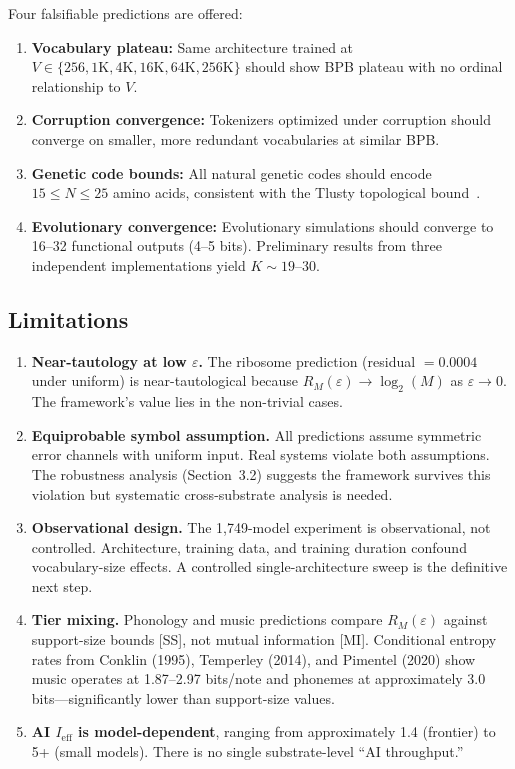 \documentclass[11pt]{article}
\begin{document}
Four falsifiable predictions are offered:
\begin{enumerate}
    \item \textbf{Vocabulary plateau:} Same architecture trained at $V \in \{256, 1\mathrm{K}, 4\mathrm{K}, 16\mathrm{K}, 64\mathrm{K}, 256\mathrm{K}\}$ should show BPB plateau with no ordinal relationship to $V$.
    \item \textbf{Corruption convergence:} Tokenizers optimized under corruption should converge on smaller, more redundant vocabularies at similar BPB.
    \item \textbf{Genetic code bounds:} All natural genetic codes should encode $15 \leq N \leq 25$ amino acids, consistent with the Tlusty topological bound~\cite{tlusty2008}.
    \item \textbf{Evolutionary convergence:} Evolutionary simulations should converge to 16--32 functional outputs (4--5 bits). Preliminary results from three independent implementations yield $K \sim 19$--30.
\end{enumerate}

\subsection{Limitations}

\begin{enumerate}
    \item \textbf{Near-tautology at low $\varepsilon$.} The ribosome prediction (residual $= 0.0004$ under uniform) is near-tautological because $R_M(\varepsilon) \to \log_2(M)$ as $\varepsilon \to 0$. The framework's value lies in the non-trivial cases.
    \item \textbf{Equiprobable symbol assumption.} All predictions assume symmetric error channels with uniform input. Real systems violate both assumptions. The robustness analysis (Section~3.2) suggests the framework survives this violation but systematic cross-substrate analysis is needed.
    \item \textbf{Observational design.} The 1,749-model experiment is observational, not controlled. Architecture, training data, and training duration confound vocabulary-size effects. A controlled single-architecture sweep is the definitive next step.
    \item \textbf{Tier mixing.} Phonology and music predictions compare $R_M(\varepsilon)$ against support-size bounds [SS], not mutual information [MI]. Conditional entropy rates from Conklin (1995), Temperley (2014), and Pimentel (2020) show music operates at 1.87--2.97 bits/note and phonemes at approximately 3.0 bits---significantly lower than support-size values.
    \item \textbf{AI $I_{\mathrm{eff}}$ is model-dependent}, ranging from approximately 1.4 (frontier) to 5+ (small models). There is no single substrate-level ``AI throughput.''
\end{enumerate}
\end{document}
